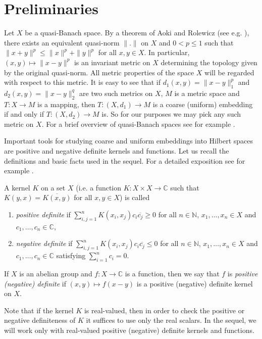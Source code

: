 \documentclass[a4paper,oneside]{amsart}
\theoremstyle{definition}
\begin{document}
\section{Preliminaries}

Let $X$ be a quasi-Banach space. By a theorem of Aoki and Rolewicz (see e.g. \cite[Proposition~H.2]{bl}), there exists an equivalent quasi-norm $\|.\|$ on $X$ and $0<p\leq1$ such that $\|x+y\|^p\leq\|x\|^p+\|y\|^p$ for all $x,y\in X$. In particular, $(x,y)\mapsto\|x-y\|^p$ is an invariant metric on $X$ determining the topology given by the original quasi-norm. All metric properties of the space $X$ will be regarded with respect to this metric. It is easy to see that if $d_1(x,y)=\|x-y\|_1^p$ and $d_2(x,y)=\|x-y\|_2^q$ are two such metrics on $X$, $M$ is a metric space and $T:X\to M$ is a mapping, then $T:(X,d_1)\to M$ is a coarse (uniform) embedding if and only if $T:(X,d_2)\to M$ is. So for our purposes we may pick any such metric on $X$. For a brief overview of quasi-Banach spaces see for example \cite[Appendix~H]{bl}.

Important tools for studying coarse and uniform embeddings into Hilbert spaces are positive and negative definite kernels and functions. Let us recall the definitions and basic facts used in the sequel. For a detailed exposition see for example \cite[Chapter~8]{bl}.

A kernel $K$ on a set $X$ (i.e. a function $K:X\times X\to{\mathbb{C}}$ such that $K(y,x)=\overline{K(x,y)}$ for all $x,y\in X$) is called 
\begin{enumerate}
\item \emph{positive definite} if $\sum_{i,j=1}^nK(x_i,x_j)c_i\overline{c_j}\geq0$ for all $n\in{\mathbb{N}}$, $x_1,\dots,x_n\in X$ and $c_1,\dots,c_n\in{\mathbb{C}}$,
\item \emph{negative definite} if $\sum_{i,j=1}^nK(x_i,x_j)c_i\overline{c_j}\leq0$ for all $n\in{\mathbb{N}}$, $x_1,\dots,x_n\in X$ and $c_1,\dots,c_n\in{\mathbb{C}}$ satisfying $\sum_{i=1}^n c_i=0$. 
\end{enumerate}
If $X$ is an abelian group and $f:X\to{\mathbb{C}}$ is a function, then we say that $f$ is \emph{positive (negative) definite} if $(x,y)\mapsto f(x-y)$ is a positive (negative) definite kernel on $X$.

Note that if the kernel $K$ is real-valued, then in order to check the positive or negative definiteness of $K$ it suffices to use only the real scalars. In the sequel, we will work only with real-valued positive (negative) definite kernels and functions.
\end{document}
